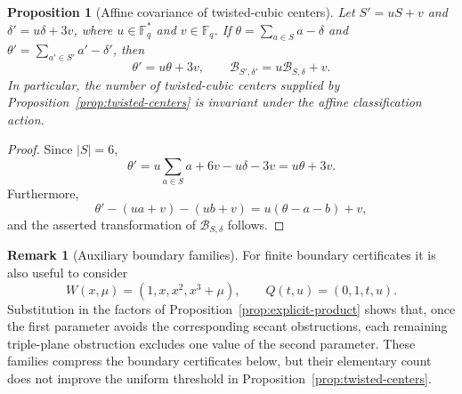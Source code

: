 \documentclass[11pt]{article}
\newcommand{\F}{\mathbb F}
\theoremstyle{plain}
\newtheorem{proposition}{Proposition}
\theoremstyle{definition}
\newtheorem{remark}{Remark}
\begin{document}
\begin{proposition}[Affine covariance of twisted-cubic centers]
\label{prop:affine-covariance}
Let \(S'=uS+v\) and \(\delta'=u\delta+3v\), where
\(u\in\F_q^\ast\) and \(v\in\F_q\).  If
\(\theta=\sum_{a\in S}a-\delta\) and
\(\theta'=\sum_{a'\in S'}a'-\delta'\), then
\[
 \theta'=u\theta+3v,\qquad
 \mathcal{B}_{S',\delta'}=u\mathcal{B}_{S,\delta}+v.
\]
In particular, the number of twisted-cubic centers supplied by
Proposition~\ref{prop:twisted-centers} is invariant under the affine
classification action.
\end{proposition}

\begin{proof}
Since \(|S|=6\),
\[
 \theta'=u\sum_{a\in S}a+6v-u\delta-3v=u\theta+3v.
\]
Furthermore,
\[
 \theta'-(ua+v)-(ub+v)=u(\theta-a-b)+v,
\]
and the asserted transformation of \(\mathcal{B}_{S,\delta}\) follows.
\end{proof}

\begin{remark}[Auxiliary boundary families]\label{rem:boundary-families}
For finite boundary certificates it is also useful to consider
\[
 W(x,\mu)=(1,x,x^2,x^3+\mu),\qquad Q(t,u)=(0,1,t,u).
\]
Substitution in the factors of Proposition~\ref{prop:explicit-product}
shows that, once the first parameter avoids the corresponding secant
obstructions, each remaining triple-plane obstruction excludes one value
of the second parameter.  These families compress the boundary
certificates below, but their elementary count does not improve the
uniform threshold in Proposition~\ref{prop:twisted-centers}.
\end{remark}
\end{document}
